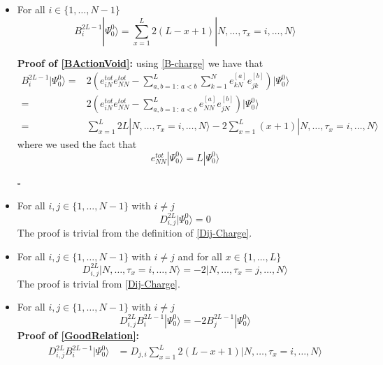 \documentclass[10pt]{article}
\numberwithin{equation}{section}
\numberwithin{equation}{subsection}
\begin{document}
\begin{itemize}
	\item For all $i\in\{1,\ldots,N-1\}$
	\begin{equation}\label{BActionVoid}
		B_{i}^{2L-1}|\Psi_{0}^{0}\rangle=\sum_{x=1}^{L}2(L-x+1)|N,\ldots,\tau_{x}=i,\ldots,N\rangle
	\end{equation}

\textbf{Proof of \eqref{BActionVoid}: } using \eqref{B-charge} we have that 
\begin{align}
	B_{i}^{2L-1}|\Psi_{0}^{0}\rangle=&2 \left(e_{iN}^{tot}e_{NN}^{tot}-\sum_{a,b=1\,:\,a<b}^{L}\sum_{k=1}^{N}e_{kN}^{[a]}e_{jk}^{[b]}\right)|\Psi_{0}^{0}\rangle\nonumber
	\\=&
	2\left(e_{iN}^{tot}e_{NN}^{tot}-\sum_{a,b=1\,:\,a<b}^{L}e_{NN}^{[a]}e_{jN}^{[b]}\right)|\Psi_{0}^{0}\rangle\nonumber\\=&
	\sum_{x=1}^{L}2L|N,\ldots,\tau_{x}=i,\ldots,N\rangle -2\sum_{x=1}^{L}(x+1)|N,\ldots,\tau_{x}=i,\ldots,N\rangle
\end{align}
where we used the fact that 
\begin{equation}\label{eNN-action}
	 e_{NN}^{tot}|\Psi_{0}^{0}\rangle=L|\Psi_{0}^{0}\rangle
\end{equation}
\begin{flushright}
	$\square$
\end{flushright}
\item For all $i,j\in\{1,\ldots,N-1\}$ with $i\neq j$
\begin{equation}\label{Dij-ref}
	D_{i,j}^{2L}|\Psi_{0}^{0}\rangle=0
\end{equation}
The proof is trivial from the definition of \eqref{Dij-Charge}. 
\item For all $i,j\in\{1,\ldots,N-1\}$ with $i\neq j$ and for all $x\in\{1,\ldots,L\}$ 
\begin{equation}
	D_{i,j}^{2L}|N,\ldots,\tau_{x}=i,\ldots,N\rangle=-2|N,\ldots,\tau_{x}=j,\ldots,N\rangle
\end{equation}
The proof is trivial from \eqref{Dij-Charge}. 
\item For all $i,j\in\{1,\ldots,N-1\}$ with $i\neq j$ 
\begin{equation}\label{GoodRelation}
	D_{i,j}^{2L}B_{i}^{2L-1}|\Psi_{0}^{0}\rangle=-2B_{j}^{2L-1}|\Psi_{0}^{0}\rangle
\end{equation}
\textbf{Proof of \eqref{GoodRelation}:}
\begin{align}
	D_{i,j}^{2L}B_{i}^{2L-1}|\Psi_{0}^{0}\rangle&= D_{j,i}\sum_{x=1}^{L}2(L-x+1)|N,\ldots,\tau_{x}=i,\ldots,N\rangle\nonumber

\end{align}
\end{itemize}
\end{document}
